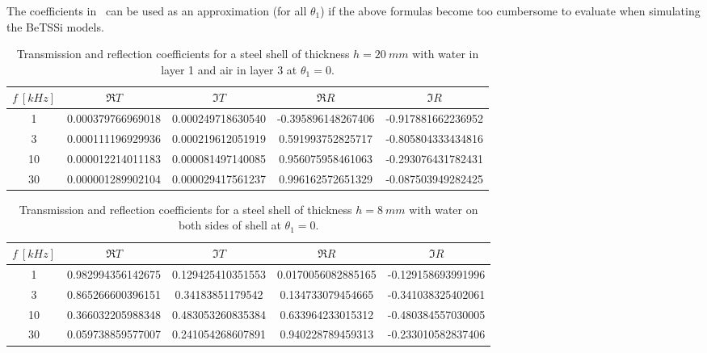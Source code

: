 The coefficients in~ can be used as an approximation (for all $\theta_1$) if the above formulas become too cumbersome to evaluate when simulating the BeTSSi models.
\begin{table}
	\centering
	\caption{Transmission and reflection coefficients for a steel shell of thickness $h=\SI{20}{mm}$ with water in layer 1 and air in layer 3 at $\theta_1=0$.}
	\label{Tab3:BeTSSiCoeffs1}
	\begin{tabular}{S[table-format = 2.0] S[table-format = -1.9,round-mode=places,round-precision=9] S[table-format = -1.9,round-mode=places,round-precision=9] S[table-format = -1.9,round-mode=places,round-precision=9] S[table-format = -1.9,round-mode=places,round-precision=9]}
		\toprule
		$f~[\si{kHz}]$ & {$\Re T$} & {$\Im T$} & {$\Re R$} & {$\Im R$}\\
		 & 0.000379766969018 & 0.000249718630540 & -0.395896148267406 & -0.917881662236952\\
3 & 0.000111196929936 & 0.000219612051919 & 0.591993752825717 & -0.805804333434816\\
10 & 0.000012214011183 & 0.000081497140085 & 0.956075958461063 & -0.293076431782431\\
30 & 0.000001289902104 & 0.000029417561237 & 0.996162572651329 & -0.087503949282425\\
		\bottomrule
	\end{tabular}
\end{table}
\begin{table}
	\centering
	\caption{Transmission and reflection coefficients for a steel shell of thickness $h=\SI{8}{mm}$ with water on both sides of shell at $\theta_1=0$.}
	\label{Tab3:BeTSSiCoeffs2}
	\begin{tabular}{S[table-format = 2.0] S[table-format = -1.9,round-mode=places,round-precision=9] S[table-format = -1.9,round-mode=places,round-precision=9] S[table-format = -1.9,round-mode=places,round-precision=9] S[table-format = -1.9,round-mode=places,round-precision=9]}
		\toprule
		$f~[\si{kHz}]$ & {$\Re T$} & {$\Im T$} & {$\Re R$} & {$\Im R$}\\
		 & 0.982994356142675 & 0.129425410351553 & 0.0170056082885165 & -0.129158693991996\\
3 & 0.865266600396151 & 0.34183851179542 & 0.134733079454665 & -0.341038325402061\\
10 & 0.366032205988348 & 0.483053260835384 & 0.633964233015312 & -0.480384557030005\\
30 & 0.059738859577007 & 0.241054268607891 & 0.940228789459313 & -0.233010582837406\\
		\bottomrule
	\end{tabular}
\end{table}